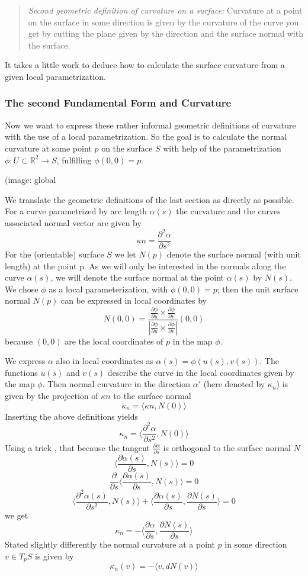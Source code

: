 \begin{quote} 
\emph{Second geometric definition of curvature on a surface:}
Curvature at a point on the surface in some direction is given by the curvature of the curve you get by cutting the plane given by the direction and the surface normal with the surface. 
\end{quote}

It takes a little work to deduce how to calculate the surface curvature from a given local parametrization. 


\subsubsection{The second Fundamental Form and Curvature}
Now we want to express these rather informal geometric definitions of curvature with the use of a local parametrization. So the goal is to calculate the normal curvature at some point $p$ on the surface $S$ with help of the parametrization $\phi: U \subset \mathbb R^2 \rightarrow S$, fulfilling $\phi(0,0) =p$. 

(image: global

We translate the geometric definitions of the last section as directly as possible. For a curve parametrized by arc length $\alpha(s)$ the curvature and the curves associated normal vector are given by
\[\kappa n = \frac{\partial^2 \alpha}{\partial s^2}\]
For the (orientable) surface $S$ we let $N(p)$ denote the surface normal (with unit length) at the point p. As we will only be interested in the normals along the curve $\alpha(s)$, we will denote the surface normal at the point $\alpha(s)$ by $N(s)$. We chose $\phi$ as a local parameterization, with $\phi(0,0) = p$; then the unit surface normal $N(p)$ can be expressed in local coordinates by
\[N(0,0) = \frac{\frac{\partial \phi}{\partial u} \times \frac{\partial \phi}{\partial v}}{|\frac{\partial \phi}{\partial u} \times \frac{\partial \phi}{\partial v}|} (0,0) \]
because $(0,0)$ are the local coordinates of $p$ in the map $\phi$.

We express $\alpha$ also in local coordinates as $\alpha (s) = \phi(u(s),v(s))$. The functions $u(s)$ and $v(s)$ describe the curve in the local coordinates given by the map $\phi$. Then normal curvature in the direction $\alpha'$ (here denoted by $\kappa_n$) is given by the projection of $\kappa n$ to the surface normal 
\[\kappa_n = \langle\kappa n , N(0)\rangle\]
Inserting the above definitions yields
\[\kappa_n = \langle\frac{\partial^2 \alpha}{\partial s^2}, N(0)\rangle\]
Using a trick , that because the tangent $\frac{\partial \alpha}{\partial s}$ is orthogonal to the surface normal $N$
\[\langle\frac{\partial \alpha(s)}{\partial s}, N(s)\rangle = 0 \]
\[ \frac{\partial}{\partial s} \langle\frac{\partial \alpha(s)}{\partial s}, N(s)\rangle = 0\]
\[\langle\frac{\partial^2 \alpha(s)}{\partial s^2}, N(s)\rangle + \langle\frac{\partial \alpha(s)}{\partial s}, \frac{\partial N(s)}{\partial s}\rangle  = 0\]
we get
\[\kappa_n = -\langle\frac{\partial \alpha}{\partial s}, \frac{\partial N(s)}{\partial s}\rangle\]
Stated slightly differently the normal curvature at a point $p$ in some direction $v \in T_pS$ is given by
\[\kappa_n(v) =  -\langle v, dN(v)\rangle \]

